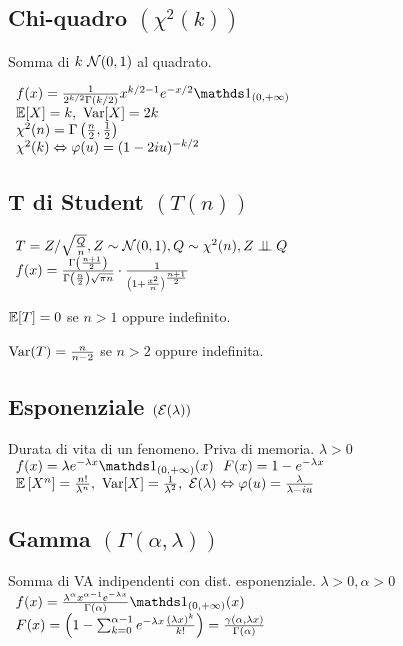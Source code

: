 \subsection{Chi-quadro $\left( \chi^2 (k)\right)$}

Somma di $k\ \mathcal N (0,1)$ al quadrato.

$ \begin{array}{l}
f(x)=\frac{1}{2^{k/2} \Gamma (k/2)} x^{k/2-1} e^{-x/2}\Ind_{(0,+\infty )}\\
\EE[X]=k,\ \Var[X]=2k\\
\chi^2 (n)=\Gamma \left(\frac{n}{2} ,\frac{1}{2}\right)\\
\chi^2 (k)\Leftrightarrow \varphi (u)=(1-2iu)^{-k/2}
\end{array}$
\subsection{T di Student $(T(n))$}

$ \begin{array}{l}
T=Z/\sqrt{\frac{Q}{n}} ,Z\sim \mathcal N (0,1),Q\sim \chi^2 (n),Z\perp \!\!\! \perp Q\\
f(x)=\frac{\Gamma \left(\frac{n+1}{2}\right)}{\Gamma \left(\frac{n}{2}\right)\sqrt{\pi n}} \cdot \frac{1}{\left( 1+\frac{x^2}{n}\right)^{\frac{n+1}{2}}}
\end{array}$

$\mathbb E[T]=0$ se $n>1$ oppure indefinito.

$\operatorname{Var}(T)=\frac{n}{n-2}$ se $n >2$ oppure indefinita.
\subsection{Esponenziale $(\mathcal E (\lambda ))$}

Durata di vita di un fenomeno. Priva di memoria. $\lambda >0$ $ \begin{array}{l}
f(x)=\lambda e^{-\lambda x}\Ind_{(0,+\infty )} (x)\ \ F(x)=1-e^{-\lambda x}\\
\EE\left[ X^n\right] =\frac{n!}{\lambda^n} ,\ \Var[X]=\frac{1}{\lambda^2} ,\ \Ec (\lambda )\Leftrightarrow \varphi (u)=\frac{\lambda}{\lambda -iu}
\end{array}$
\subsection{Gamma $(\Gamma (\alpha ,\lambda ))$}

Somma di VA indipendenti con dist. esponenziale. $\lambda >0,\alpha >0$ $ \begin{array}{l}
f(x)=\frac{\lambda^{\alpha} x^{\alpha -1} e^{-\lambda x}}{\Gamma (\alpha )}\Ind_{(0,+\infty )} (x)\\
F(x)=\left( 1-\sum^{\alpha -1}_{k=0} e^{-\lambda x}\frac{(\lambda x)^k}{k!}\right) =\frac{\gamma (\alpha ,\lambda x)}{\Gamma (\alpha )}
\end{array}$

